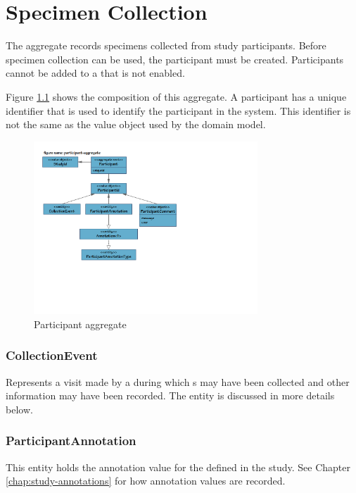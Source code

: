 \chapter{Specimen Collection}

The  aggregate records specimens collected
from study participants. Before specimen collection can be used, the
participant must be created. Participants cannot be added to a
 that is not enabled.

Figure \ref{fig:participant-aggregate} shows the composition of this aggregate.
A participant has a unique identifier that is used to identify the participant
in the system. This identifier is not the same as the
 value object used by the domain model.

\begin{figure}[H]
  \centering
  \includegraphics[trim={10mm 67mm 98mm 18mm}, clip,
    width=0.75\textwidth]{images/participant-aggregate}
  \caption{Participant aggregate}
  \label{fig:participant-aggregate}
\end{figure}

\subsection*{CollectionEvent}
Represents a visit made by a  during which
s may have been collected and other information may have
been recorded. The  entity is discussed in more
details below.

\subsection*{ParticipantAnnotation}
This entity holds the annotation value for the
 defined in the study. See Chapter
\ref{chap:study-annotations} for how annotation values are recorded.

